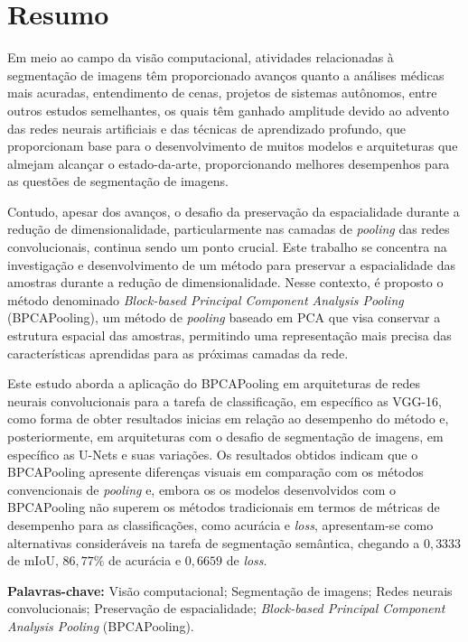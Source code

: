 \section*{Resumo}
\thispagestyle{empty}
\makeatletter
\makeatother
Em meio ao campo da visão computacional, atividades relacionadas à segmentação de imagens têm proporcionado avanços quanto a análises médicas mais acuradas, entendimento de cenas, projetos de sistemas autônomos, entre outros estudos semelhantes, os quais têm ganhado amplitude devido ao advento das redes neurais artificiais e das técnicas de aprendizado profundo, que proporcionam base para o desenvolvimento de muitos modelos e arquiteturas que almejam alcançar o estado-da-arte, proporcionando melhores desempenhos para as questões de segmentação de imagens.

Contudo, apesar dos avanços, o desafio da preservação da espacialidade durante a redução de dimensionalidade, particularmente nas camadas de \textit{pooling} das redes convolucionais, continua sendo um ponto crucial. Este trabalho se concentra na investigação e desenvolvimento de um método para preservar a espacialidade das amostras durante a redução de dimensionalidade. Nesse contexto, é proposto o método denominado \textit{Block-based Principal Component Analysis Pooling} (BPCAPooling), um método de \textit{pooling} baseado em PCA que visa conservar a estrutura espacial das amostras, permitindo uma representação mais precisa das características aprendidas para as próximas camadas da rede.

Este estudo aborda a aplicação do BPCAPooling em arquiteturas de redes neurais convolucionais para a tarefa de classificação, em específico as VGG-16, como forma de obter resultados inicias em relação ao desempenho do método e, posteriormente, em arquiteturas com o desafio de segmentação de imagens, em específico as U-Nets e suas variações. Os resultados obtidos indicam que o BPCAPooling apresente diferenças visuais em comparação com os métodos convencionais de \textit{pooling} e, embora os os modelos desenvolvidos com o BPCAPooling não superem os métodos tradicionais em termos de métricas de desempenho para as classificações, como acurácia e \textit{loss}, apresentam-se como alternativas consideráveis na tarefa de segmentação semântica, chegando a $0,3333$ de mIoU, $86,77\%$ de acurácia e $0,6659$ de \textit{loss}.

\textbf{Palavras-chave:} Visão computacional; Segmentação de imagens; Redes neurais convolucionais; Preservação de espacialidade; \textit{Block-based Principal Component Analysis Pooling} (BPCAPooling).
